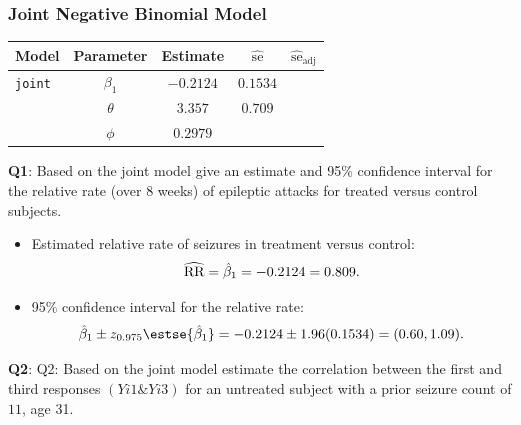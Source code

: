 \documentclass[oneside]{book}\usepackage[]{graphicx}\usepackage[svgnames]{xcolor}
\let\exp\relax%
\newcommand{\RR}{\text{RR}}%
\begin{document}
\subsubsection*{Joint Negative Binomial Model}
\begin{table}[H]
      \centering
      \begin{tabular}{lcccc}
            Model          & Parameter   & Estimate    & $ \widehat{\text{se}} $ & $ \widehat{\text{se}}_{\text{adj}} $ \\
            \midrule
            \texttt{joint} & $ \beta_1 $ & $ -0.2124 $ & $ 0.1534 $              &                                      \\
                           & $ \theta $  & $3.357$     & $ 0.709 $                                                      \\
                           & $ \phi $    & $0.2979$                                                                     \\
            \bottomrule
      \end{tabular}
\end{table}
\begin{Example}{}
      \textbf{Q1}: Based on the joint model give an estimate and 95\% confidence interval for the
      relative rate (over 8 weeks) of epileptic attacks for treated versus control subjects.
\end{Example}
\begin{itemize}
      \item Estimated relative rate of seizures in treatment versus control:
            \[ \widehat{\RR}=\exp{\hat{\beta}_1}=\exp{-0.2124}=0.809. \]
      \item 95\% confidence interval for the relative rate:
            \[ \exp{\hat{\beta}_1\pm z_{0.975}\estse{\hat{\beta}_1}}=\exp{-0.2124\pm 1.96(0.1534)}=(0.60,1.09). \]
\end{itemize}
\begin{Example}{}
      \textbf{Q2}: Q2: Based on the joint model estimate the correlation between the first and third
      responses $(Yi1 \& Yi3)$ for an untreated subject with a prior seizure count of $11$, age 31.
\end{Example}
\end{document}
